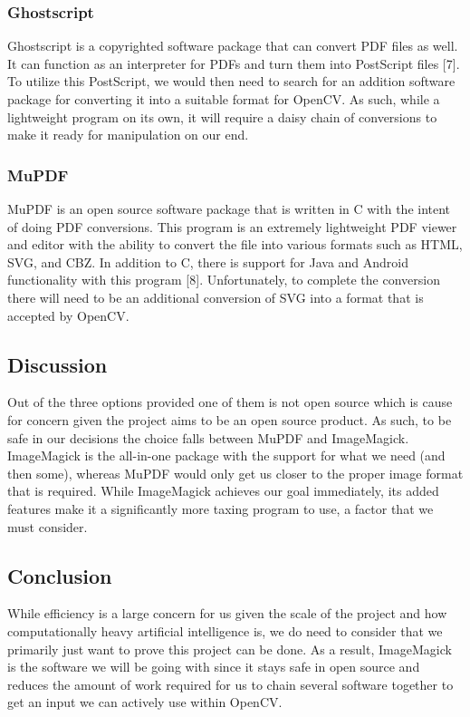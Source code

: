 \documentclass[onecolumn, draftclsnofoot,10pt, compsoc]{IEEEtran}
\begin{document}
\subsubsection{Ghostscript}
Ghostscript is a copyrighted software package that can convert PDF files as well. It can function as an interpreter for PDFs and turn them into PostScript files [7]. To utilize this PostScript, we would then need to search for an addition software package for converting it into a suitable format for OpenCV. As such, while a lightweight program on its own, it will require a daisy chain of conversions to make it ready for manipulation on our end. 

\subsubsection{MuPDF}
MuPDF is an open source software package that is written in C with the intent of doing PDF conversions. This program is an extremely lightweight PDF viewer and editor with the ability to convert the file into various formats such as HTML, SVG, and CBZ. In addition to C, there is support for Java and Android functionality with this program [8]. Unfortunately, to complete the conversion there will need to be an additional conversion of SVG into a format that is accepted by OpenCV. 

\subsection{Discussion}
Out of the three options provided one of them is not open source which is cause for concern given the project aims to be an open source product. As such, to be safe in our decisions the choice falls between MuPDF and ImageMagick. ImageMagick is the all-in-one package with the support for what we need (and then some), whereas MuPDF would only get us closer to the proper image format that is required. While ImageMagick achieves our goal immediately, its added features make it a significantly more taxing program to use, a factor that we must consider.

\subsection{Conclusion}
While efficiency is a large concern for us given the scale of the project and how computationally heavy artificial intelligence is, we do need to consider that we primarily just want to prove this project can be done. As a result, ImageMagick is the software we will be going with since it stays safe in open source and reduces the amount of work required for us to chain several software together to get an input we can actively use within OpenCV.
\end{document}
